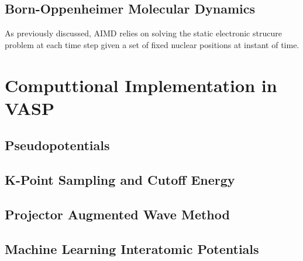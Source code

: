 \subsection{Born-Oppenheimer Molecular Dynamics}
As previously discussed, AIMD relies on solving the static electronic strucure 
problem at each time step given a set of fixed nuclear positions at instant of time.


\section{Computtional Implementation in VASP}
\subsection{Pseudopotentials}
\subsection{K-Point Sampling and Cutoff Energy}
\subsection{Projector Augmented Wave Method}
\subsection{Machine Learning Interatomic Potentials}



